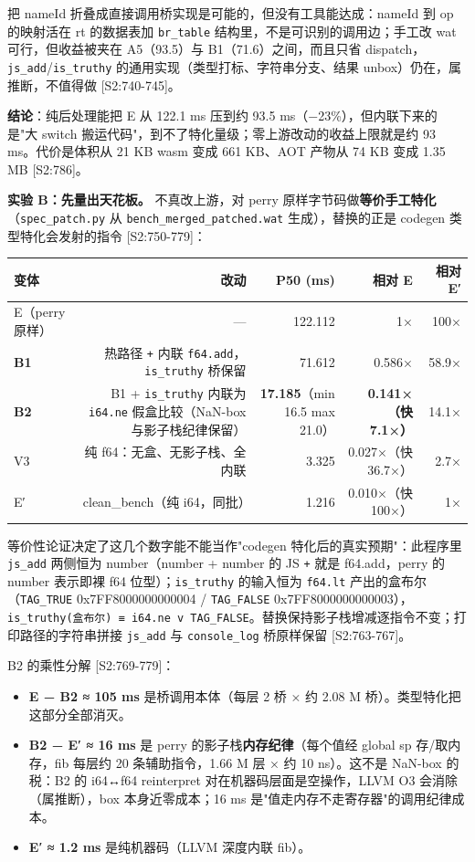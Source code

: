 \documentclass[11pt, a4paper]{article}
\begin{document}
把 nameId 折叠成直接调用桥实现是可能的，但没有工具能达成：nameId 到 op 的映射活在 rt 的数据表加 \texttt{br\_table} 结构里，不是可识别的调用边；手工改 wat 可行，但收益被夹在 A5（93.5）与 B1（71.6）之间，而且只省 dispatch，\texttt{js\_add}/\texttt{is\_truthy} 的通用实现（类型打标、字符串分支、结果 unbox）仍在，属推断，不值得做 [S2:740-745]。


\textbf{结论}：纯后处理能把 E 从 122.1 ms 压到约 93.5 ms（−23\%），但内联下来的是"大 switch 搬运代码"，到不了特化量级；零上游改动的收益上限就是约 93 ms。代价是体积从 21 KB wasm 变成 661 KB、AOT 产物从 74 KB 变成 1.35 MB [S2:786]。


\textbf{实验 B：先量出天花板。} 不真改上游，对 perry 原样字节码做\textbf{等价手工特化}（\texttt{spec\_patch.py} 从 \texttt{bench\_merged\_patched.wat} 生成），替换的正是 codegen 类型特化会发射的指令 [S2:750-779]：


\begin{center}\small\begin{tabular}{lrrrr}
\toprule
变体 & 改动 & P50 (ms) & 相对 E & 相对 E′ \\
\midrule
E（perry 原样） & — & 122.112 & 1× & 100× \\
\textbf{B1} & 热路径 \texttt{+} 内联 \texttt{f64.add}，\texttt{is\_truthy} 桥保留 & 71.612 & 0.586× & 58.9× \\
\textbf{B2} & B1 + \texttt{is\_truthy} 内联为 \texttt{i64.ne} 假盒比较（NaN-box 与影子栈纪律保留） & \textbf{17.185}（min 16.5 max 21.0） & \textbf{0.141×（快 7.1×）} & 14.1× \\
V3 & 纯 f64：无盒、无影子栈、全内联 & 3.325 & 0.027×（快 36.7×） & 2.7× \\
E′ & clean\_bench（纯 i64，同批） & 1.216 & 0.010×（快 100×） & 1× \\
\bottomrule
\end{tabular}\end{center}


等价性论证决定了这几个数字能不能当作"codegen 特化后的真实预期"：此程序里 \texttt{js\_add} 两侧恒为 number（number + number 的 JS \texttt{+} 就是 f64.add，perry 的 number 表示即裸 f64 位型）；\texttt{is\_truthy} 的输入恒为 \texttt{f64.lt} 产出的盒布尔（\texttt{TAG\_TRUE} 0x7FF8000000000004 / \texttt{TAG\_FALSE} 0x7FF8000000000003），\texttt{is\_truthy(盒布尔) ≡ i64.ne v TAG\_FALSE}。替换保持影子栈增减逐指令不变；打印路径的字符串拼接 \texttt{js\_add} 与 \texttt{console\_log} 桥原样保留 [S2:763-767]。


B2 的乘性分解 [S2:769-779]：


\begin{itemize}
\item \textbf{E − B2 ≈ 105 ms} 是桥调用本体（每层 2 桥 × 约 2.08 M 桥）。类型特化把这部分全部消灭。
\item \textbf{B2 − E′ ≈ 16 ms} 是 perry 的影子栈\textbf{内存纪律}（每个值经 global sp 存/取内存，fib 每层约 20 条辅助指令，1.66 M 层 × 约 10 ns）。这不是 NaN-box 的税：B2 的 i64↔f64 reinterpret 对在机器码层面是空操作，LLVM O3 会消除（属推断），box 本身近零成本；16 ms 是"值走内存不走寄存器"的调用纪律成本。
\item \textbf{E′ ≈ 1.2 ms} 是纯机器码（LLVM 深度内联 fib）。
\end{itemize}
\end{document}
